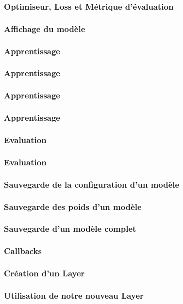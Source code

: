 \begin{frame}
  \frametitle{Optimiseur, Loss et Métrique d'évaluation}
\end{frame}

\begin{frame}
  \frametitle{Affichage du modèle}
\end{frame}

\begin{frame}
  \frametitle{Apprentissage}
\end{frame}

\begin{frame}
  \frametitle{Apprentissage}
\end{frame}

\begin{frame}
  \frametitle{Apprentissage}
\end{frame}

\begin{frame}
  \frametitle{Apprentissage}
\end{frame}

\begin{frame}
  \frametitle{Evaluation}
\end{frame}

\begin{frame}
  \frametitle{Evaluation}
\end{frame}

\begin{frame}
  \frametitle{Sauvegarde de la configuration d'un modèle}
\end{frame}

\begin{frame}
  \frametitle{Sauvegarde des poids d'un modèle}
\end{frame}

\begin{frame}
  \frametitle{Sauvegarde d'un modèle complet}
\end{frame}

\begin{frame}
  \frametitle{Callbacks}
\end{frame}

\begin{frame}
  \frametitle{Création d'un Layer}
\end{frame}

\begin{frame}
  \frametitle{Utilisation de notre nouveau Layer}
\end{frame}

